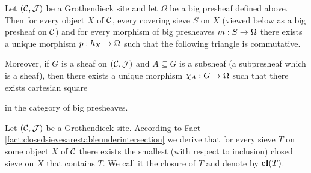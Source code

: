 \begin{theorem}\label{theorem:propertiesofsubobjectclassifier}
Let $({\mathcal C},{\mathcal J})$ be a Grothendieck site and let $\Omega$ be a big presheaf defined above. Then for every object $X$ of ${\mathcal C}$, every covering sieve $S$ on $X$ (viewed below as a big presheaf on ${\mathcal C}$) and for every morphism of big presheaves $m:S\rightarrow \Omega$ there exists a unique morphism $p:h_X\rightarrow \Omega$ such that the following triangle is commutative.
\begin{center}
\end{center}
Moreover, if $G$ is a sheaf on $({\mathcal C},{\mathcal J})$ and $A\subseteq G$ is a subsheaf (a subpresheaf which is a sheaf), then there exists a unique morphism $\chi_A:G\rightarrow \Omega$ such that there exists cartesian square
\begin{center}
\end{center}
in the category of big presheaves.
\end{theorem}
\noindent
Let $({\mathcal C},{\mathcal J})$ be a Grothendieck site. According to Fact \ref{fact:closedsievesarestableunderintersection} we derive that for every sieve $T$ on some object $X$ of ${\mathcal C}$ there exists the smallest (with respect to inclusion) closed sieve on $X$ that contains $T$. We call it the closure of $T$ and denote by $\mathbf{cl}(T)$.

